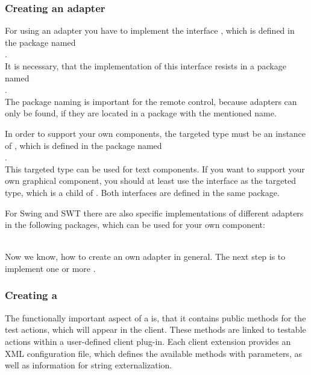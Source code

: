 \subsubsection{Creating an adapter}

For using an adapter you have to implement the interface
, which is defined in the package named\\
.\\
It is necessary, that the implementation of this interface resists in a package
named\\
.\\
The package naming is important for the \app{} remote control, because adapters
can only be found, if they are located in a package with the mentioned name.

In order to support your own components, the targeted type must be an instance
of , which is defined in the package named\\
.\\
This targeted type can be used for text components. If you want to support your
own graphical component, you should at least use the interface
 as the targeted type, which is a child of
. Both interfaces are defined in the same package.

For Swing and SWT there are also specific implementations of different
adapters in the following packages, which can be used for your own component:\\
\\

Now we know, how to create an own adapter in general. The next step is to
implement one or more \gdtesterclass. 

\subsubsection{Creating a \gdtesterclass}

The functionally important aspect of a \gdtesterclass is, that it
contains public methods for the \app{} test actions, which will appear in
the client. These methods are linked to testable actions within a user-defined
\app{} client plug-in. Each \app{} client extension provides an XML
configuration file, which defines the available methods with parameters, as
well as information for string externalization.

